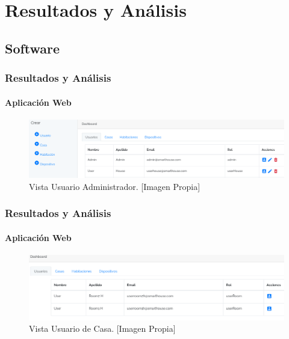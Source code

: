 \section{Resultados y Análisis}
\subsection{Software}
\begin{frame}[t]
\frametitle{Resultados y Análisis}
\framesubtitle{Aplicación Web}

	\begin{figure}[!]
		\centering
		\caption{Vista Usuario Administrador. [Imagen Propia]}
		\label{fig:adminview}
		\includegraphics[width=\linewidth]{Imagenes/Admin_view}
	\end{figure}

\end{frame}	

\begin{frame}[t]
\frametitle{Resultados y Análisis}
\framesubtitle{Aplicación Web}
	
	\begin{figure}[!]
		\centering
		\caption{Vista Usuario de Casa. [Imagen Propia]}
		\label{fig:houseview}
		\includegraphics[width=\linewidth]{Imagenes/UserH_view}
	\end{figure}

\end{frame}

